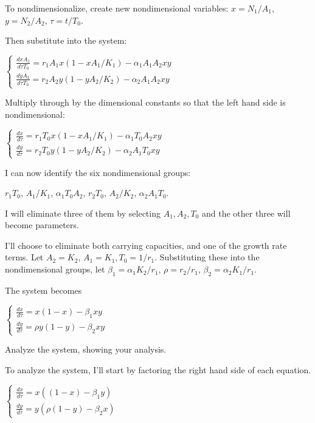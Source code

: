 \documentclass[12pt,letterpaper,answers]{exam}
\begin{document}
\begin{questions}
\begin{parts}
\begin{solution}
To nondimensionalize, create new nondimensional variables: $x = N_1/A_1$, $y = N_2/A_2$, $\tau = t / T_0$.

Then substitute into the system: 

$\displaystyle\left\{\begin{array}{l} \frac{dxA_1}{d\tau T_0} =  r_1 A_1 x (1-x A_1/K_1) - \alpha_1 A_1 A_2 x y \\  \frac{dy A_2}{d\tau T_0} =  r_2 A_2 y(1-yA_2/K_2) - \alpha_2A_1 A_2 xy\end{array}\right.$

Multiply through by the dimensional constants so that the left hand side is nondimensional:

$\left\{\begin{array}{l} \frac{dx}{d\tau} =  r_1T_0 x (1-x A_1/K_1) - \alpha_1 T_0 A_2 x y \\  \frac{dy}{d\tau} =  r_2 T_0 y(1-yA_2/K_2) - \alpha_2A_1 T_0 xy\end{array}\right.$

I can now identify the six nondimensional groups: 

$r_1 T_0$, $A_1/K_1$, $\alpha_1 T_0 A_2$, $r_2 T_0$, $A_2/K_2$, $\alpha_2A_1T_0$.

I will eliminate three of them by selecting $A_1, A_2, T_0$ and the other three will become parameters.

I'll choose to eliminate both carrying capacities, and one of the growth rate terms.  Let $A_2 = K_2$, $A_1 = K_1,  T_0 = 1/r_1$.  Substituting these into the nondimensional groups, let $\beta_1 = \alpha_1 K_2 / r_1$, $\rho = r_2/r_1$, $\beta_2 = \alpha_2 K_1/r_1$.


The system becomes

$\left\{\begin{array}{l} \frac{dx}{d\tau} =   x (1-x ) - \beta_1 x y \\  \frac{dy}{d\tau} =  \rho y(1-y) - \beta_2 xy\end{array}\right.$

\end{solution}

\item Analyze the system, showing your analysis.  

\begin{solution}

To analyze the system, I'll start by factoring the right hand side of each equation.

$\left\{\begin{array}{l} \frac{dx}{d\tau} =   x\left( (1-x ) - \beta_1  y\right) \\  \frac{dy}{d\tau} =  y\left(\rho (1-y) - \beta_2 x\right)\end{array}\right.$


\end{solution}
\end{parts}
\end{questions}
\end{document}
